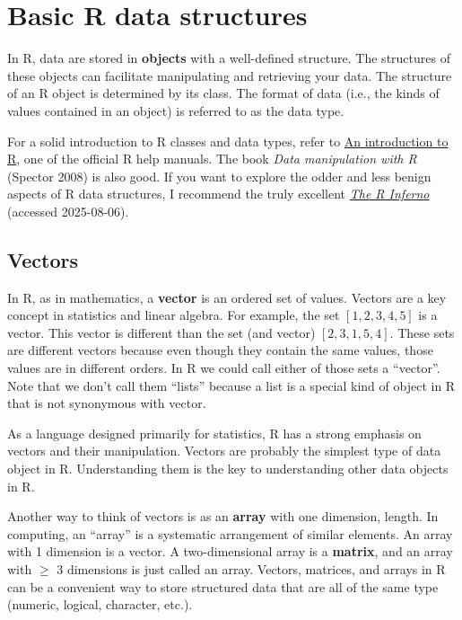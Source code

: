 \documentclass[
  13,
  letterpaper,
]{report}
\begin{document}
\section{Basic R data structures}\label{sec-03-struct}

In R, data are stored in \textbf{objects} with a well-defined structure.
The structures of these objects can facilitate manipulating and
retrieving your data. The structure of an R object is determined by its
class. The format of data (i.e., the kinds of values contained in an
object) is referred to as the data type.

For a solid introduction to R classes and data types, refer to
\href{https://cran.r-project.org/doc/manuals/r-release/R-intro.html}{An
introduction to R}, one of the official R help manuals. The book
\emph{Data manipulation with R} (Spector 2008) is also good. If you want
to explore the odder and less benign aspects of R data structures, I
recommend the truly excellent
\href{https://www.burns-stat.com/pages/Tutor/R_inferno.pdf}{\emph{The R
Inferno}} (accessed 2025-08-06).

\subsection{Vectors}\label{sec-03-struct-vect}

In R, as in mathematics, a \textbf{vector} is an ordered set of values.
Vectors are a key concept in statistics and linear algebra. For example,
the set \([1,2,3,4,5]\) is a vector. This vector is different than the
set (and vector) \([2,3,1,5,4]\). These sets are different vectors
because even though they contain the same values, those values are in
different orders. In R we could call either of those sets a ``vector''.
Note that we don't call them ``lists'' because a list is a special kind
of object in R that is not synonymous with vector.

As a language designed primarily for statistics, R has a strong emphasis
on vectors and their manipulation. Vectors are probably the simplest
type of data object in R. Understanding them is the key to understanding
other data objects in R.

Another way to think of vectors is as an \textbf{array} with one
dimension, length. In computing, an ``array'' is a systematic
arrangement of similar elements. An array with 1 dimension is a vector.
A two-dimensional array is a \textbf{matrix}, and an array with \(\ge\)
3 dimensions is just called an array. Vectors, matrices, and arrays in R
can be a convenient way to store structured data that are all of the
same type (numeric, logical, character, etc.).
\end{document}
